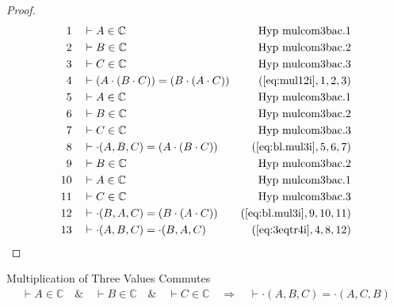 \begin{proof}
\begin{align}
  1 &&  & \vdash A \in \mathbb{C}&\text{Hyp~mulcom3bac.1}\notag%
  \\ 2 &&  & \vdash B \in
\mathbb{C}&\text{Hyp~mulcom3bac.2}\notag%
  \\ 3 &&  & \vdash C \in
\mathbb{C}&\text{Hyp~mulcom3bac.3}\notag%
  \\ 4 &&  & \vdash ( A \cdot ( B \cdot C ) ) = ( B \cdot ( A \cdot C ) )&(\mbox{\ref{eq:mul12i}},1,2,3)\notag
  \\ 5 &&  & \vdash A \in
\mathbb{C}&\text{Hyp~mulcom3bac.1}\notag%
  \\ 6 &&  & \vdash B \in
\mathbb{C}&\text{Hyp~mulcom3bac.2}\notag%
  \\ 7 &&  & \vdash C \in
\mathbb{C}&\text{Hyp~mulcom3bac.3}\notag%
  \\ 8 &&  & \vdash \cdot( A , B , C ) = ( A \cdot ( B \cdot C ) )&(\mbox{\ref{eq:bl.mul3i}},5,6,7)\notag
  \\ 9 &&  & \vdash B \in
\mathbb{C}&\text{Hyp~mulcom3bac.2}\notag%
  \\ 10 &&  & \vdash A \in
\mathbb{C}&\text{Hyp~mulcom3bac.1}\notag%
  \\ 11 &&  & \vdash C \in
\mathbb{C}&\text{Hyp~mulcom3bac.3}\notag%
  \\ 12 &&  & \vdash \cdot( B , A , C ) = ( B \cdot ( A \cdot C ) )&(\mbox{\ref{eq:bl.mul3i}},9,10,11)\notag
  \\ 13 &&  & \vdash \cdot( A , B , C ) = \cdot( B , A , C )&(\mbox{\ref{eq:3eqtr4i}},4,8,12)\notag
\end{align}
\end{proof}

\begin{lemma} Multiplication of Three Values
Commutes
\begin{align}
\vdash A \in \mathbb{C}\quad\&\quad \vdash B \in \mathbb{C}\quad\&\quad \vdash
    C \in \mathbb{C}\quad\Rightarrow\quad \vdash \cdot( A , B , C ) = \cdot( A
    , C , B )\label{eq:bl.mulcom3acb}\tag{bl.mulcom3acb}
\end{align}
\end{lemma}

